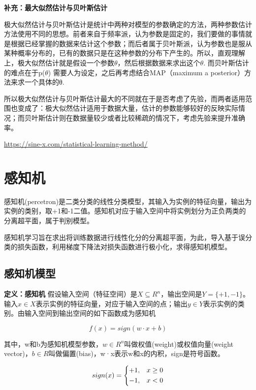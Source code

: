 \documentclass{ctexart}
\begin{document}
	\mbox{}

	\textbf{补充：最大似然估计与贝叶斯估计}
	
	极大似然估计与贝叶斯估计是统计中两种对模型的参数确定的方法，两种参数估计方法使用不同的思想。前者来自于频率派，认为参数是固定的，我们要做的事情就是根据已经掌握的数据来估计这个参数；而后者属于贝叶斯派，认为参数也是服从某种概率分布的，已有的数据只是在这种参数的分布下产生的。所以，直观理解上，极大似然估计就是假设一个参数\(\theta\)，然后根据数据来求出这个\(\theta\). 而贝叶斯估计的难点在于p(\(\theta\)) 需要人为设定，之后再考虑结合MAP（maximum a posterior）方法来求一个具体的θ. 
	
	
	所以极大似然估计与贝叶斯估计最大的不同就在于是否考虑了先验，而两者适用范围也变成了：{\color{red}极大似然估计适用于数据大量，估计的参数能够较好的反映实际情况；而贝叶斯估计则在数据量较少或者比较稀疏的情况下，考虑先验来提升准确率}。

	
	\url{https://sine-x.com/statistical-learning-method/}

	\section{感知机}
	
	感知机(percetron)是二类分类的线性分类模型，其输入为实例的特征向量，输出为实例的类别，取+1和-1二值。感知机对应于输入空间中将实例划分为正负两类的分离超平面，属于判别模型。
	
	感知机学习旨在求出将训练数据进行线性化分的分离超平面，为此，导入基于误分类的损失函数，利用梯度下降法对损失函数进行极小化，求得感知机模型。

	\subsection{感知机模型}
	
	\textbf{定义：感知机} 假设输入空间（特征空间）是\(X \subseteq R^n\)，输出空间是\(Y = \{+1, -1\}\)。输入\(x \in X\)表示实例的特征向量，对应于输入空间的点；输出\(y \in Y\)表示实例的类别。由输入空间到输出空间的如下函数成为感知机
	
	\[f(x) = sign(w·x + b)\]
	
	其中，w和b为感知机模型参数，\(w \in R^n\)叫做权值(weight)或权值向量(weight vector)，\(b \in R\)叫做偏置(bias)，w·x表示w和x的内积，sign是符号函数。
	
	\[sign(x) = 
	\begin{dcases}
	+1, & x \geq 0 \\
	-1, &  x < 0
	\end{dcases}\]
	
\end{document}
